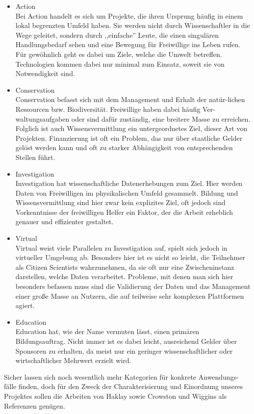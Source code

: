 \documentclass{article}
\begin{document}
\begin{itemize}
\item{Action\\
Bei Action handelt es sich um Projekte, die ihren Ursprung häufig in einem lokal begrenzten Umfeld haben.
Sie werden nicht durch Wissenschaftler in die Wege geleitet,
sondern durch ,,einfache'' Leute, die einen singulären Handlungsbedarf sehen und eine Bewegung für Freiwillige ins Leben rufen.
Für gewöhnlich geht es dabei um Ziele, welche die Umwelt betreffen.
Technologien kommen dabei nur minimal zum Einsatz, soweit sie von Notwendigkeit sind.}
\item{Conservation\\
Conservation befasst sich mit dem Management und Erhalt der natür-lichen Ressourcen bzw. Biodiversität.
Freiwillige haben dabei häufig Ver-waltungsaufgaben oder sind dafür zuständig, eine breitere Masse zu erreichen.
Folglich ist auch Wissensvermittlung ein untergeordnetes Ziel, dieser Art von Projekten.
Finanzierung ist oft ein Problem, das nur über staatliche Gelder gelöst werden kann und oft
zu starker Abhängigkeit von entsprechenden Stellen führt.}
\item{Investigation\\
Investigation hat wissenschaftliche Datenerhebungen zum Ziel.
Hier werden Daten von Freiwilligen im physikalischen Umfeld gesammelt.
Bildung und Wissensvermittlung sind hier zwar kein explizites Ziel, oft jedoch sind Vorkenntnisse der freiwilligen Helfer ein Faktor,
der die Arbeit erheblich genauer und effizienter gestaltet.}
\item{Virtual\\
Virtual weist viele Parallelen zu Investigation auf, spielt sich jedoch in virtueller Umgebung ab.
Besonders hier ist es nicht so leicht, die Teilnehmer als Citizen Scientists wahrzunehmen, da sie oft nur eine Zwischeninstanz darstellen,
welche Daten verarbeitet.
Probleme, mit denen man sich hier besonders befassen muss sind die Validierung der Daten und das Management
einer große Masse an Nutzern, die auf teilweise sehr komplexen Plattformen agiert.}
\item{Education\\
Education hat, wie der Name vermuten lässt, einen primären Bildungsauftrag.
Nicht immer ist es dabei leicht, ausreichend Gelder über Sponsoren zu erhalten, da meist nur ein geringer wissenschaftlicher oder
wirtschaftlicher Mehrwert erzielt wird.}
\end{itemize}
Sicher lassen sich noch wesentlich mehr Kategorien für konkrete Anwendungs-fälle finden,
doch für den Zweck der Charakterisierung und Einordnung unseres Projektes sollen die Arbeiten von Haklay sowie Crowston und Wiggins
als Referenzen genügen.
\end{document}
